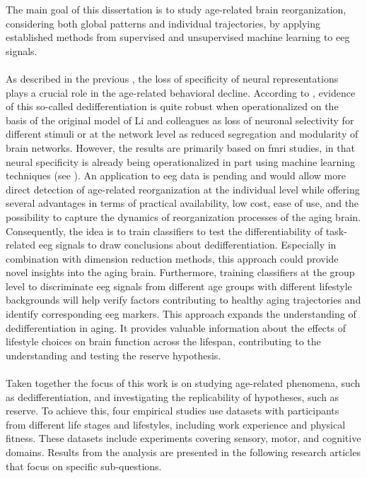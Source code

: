 The main goal of this dissertation is to study age-related brain reorganization, considering both global patterns and individual trajectories, by applying established methods from supervised and unsupervised machine learning to \gls{eeg} signals.\\
\\
As described in the previous , the loss of specificity of neural representations plays a crucial role in the age-related behavioral decline. According to \citeauthor{Koen2019}, evidence of this so-called dedifferentiation is quite robust when operationalized on the basis of the original model of Li and colleagues \cite{Li2001,Li2002} as loss of neuronal selectivity for different stimuli or at the network level as reduced segregation and modularity of brain networks. However, the results are primarily based on \gls{fmri} studies, in that neural specificity is already being operationalized in part using machine learning techniques (see ). An application to \gls{eeg} data is pending and would allow more direct detection of age-related reorganization at the individual level while offering several advantages in terms of practical availability, low cost, ease of use, and the possibility to capture the dynamics of reorganization processes of the aging brain. Consequently, the idea is to train classifiers to test the differentiability of task-related \gls{eeg} signals to draw conclusions about dedifferentiation. Especially in combination with dimension reduction methods, this approach could provide novel insights into the aging brain. Furthermore, training classifiers at the group level to discriminate \gls{eeg} signals from different age groups with different lifestyle backgrounds will help verify factors contributing to healthy aging trajectories and identify corresponding \gls{eeg} markers. This approach expands the understanding of dedifferentiation in aging. It provides valuable information about the effects of lifestyle choices on brain function across the lifespan, contributing to the understanding and testing the reserve hypothesis.\\
\\
Taken together the focus of this work is on studying age-related phenomena, such as dedifferentiation, and investigating the replicability of hypotheses, such as reserve. To achieve this, four empirical studies use datasets with participants from different life stages and lifestyles, including work experience and physical fitness. These datasets include experiments covering sensory, motor, and cognitive domains. Results from the analysis are presented in the following research articles that focus on specific sub-questions.\\
